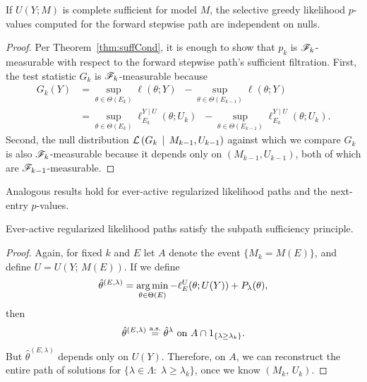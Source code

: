 \documentclass{article}
\begin{document}
\begin{corollary}\label{cor:greedyLikIndep}
  If $U(Y; M)$ is complete sufficient for model $M$, the selective greedy likelihood $p$-values computed for the forward stepwise path are independent on nulls.
\end{corollary}
\begin{proof}
  Per Theorem~\ref{thm:suffCond}, it is enough to show that $p_k$ is $\mathscr{F}_k$-measurable with respect to the forward stepwise path's sufficient filtration. First, the test statistic $G_k$ is $\mathscr{F}_k$-measurable because
  \begin{align*}
    G_k(Y) &= \sup_{\theta\in \Theta(E_k)} {\ell(\theta; Y)} \;\;- \sup_{\theta\in \Theta(E_{k-1})} {\ell(\theta; Y)}\\
    &= \sup_{\theta\in \Theta(E_k)} {\ell_{E_k}^{Y\mid U}(\theta; U_k)} \;\;- \sup_{\theta\in \Theta(E_{k-1})} {\ell_{E_k}^{Y\mid U}(\theta; U_k)}.
  \end{align*}
  Second, the null distribution $\mathcal{L}\left(G_k \,\mid\, M_{k-1}, U_{k-1}\right)$ against which we compare $G_k$ is also $\mathscr{F}_k$-measurable because it depends only on $(M_{k-1}, U_{k-1})$, both of which are $\mathscr{F}_{k-1}$-measurable.
\end{proof}

Analogous results hold for ever-active regularized likelihood paths and the next-entry $p$-values.

\begin{proposition}\label{prop:regPathSSP}
Ever-active regularized likelihood paths satisfy the
subpath sufficiency principle.
\end{proposition}

\begin{proof}
  Again, for fixed $k$ and $E$ let $A$ denote the event $\{M_k = M(E)\}$, and define $U=U(Y;\, M(E))$. If we define
\[
\hat\theta^{(E,\lambda)} = \operatorname*{arg\,min}_{\theta\in\Theta(E)} -\ell_E^{U}(\theta; U(Y)) + P_\lambda(\theta),
\]
then 
\[
\hat\theta^{(E,\lambda)} \overset{\textrm{a.s.}}{=} \hat\theta^{\lambda} \text{ on } 
A \cap 1_{\{\lambda \geq \lambda_k\}}.
\]
But $\hat\theta^{(E,\lambda)}$ depends only on $U(Y)$. Therefore, on $A$, we can reconstruct the entire path of solutions for $\{\lambda\in \Lambda:\; \lambda\geq \lambda_k\}$, once we know $(M_k,\,U_k)$.
\end{proof}
\end{document}
